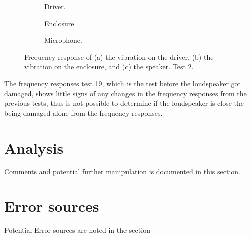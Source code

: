 \begin{figure}[H]
\centering
\begin{subfigure}[t]{0.37\textwidth}
	
	\caption{Driver.}
	\label{fig:FFT_driver10}
\end{subfigure}
\begin{subfigure}[t]{0.28\textwidth}
	
	\caption{Enclosure.}
	\label{fig:FFT_enclosure19}
\end{subfigure}
\begin{subfigure}[t]{0.32\textwidth}
	
	\caption{Microphone.}
	\label{fig:FFT_mic19}
\end{subfigure}
\caption{Frequency response of (a) the vibration on the driver, (b) the vibration on the enclosure, and (c) the speaker. Test 2.}
\label{fig:FFT1}
\end{figure} 

The frequency responses test 19, which is the test before the loudspeaker got damaged, shows little signs of any changes in the frequency responses from the previous tests, thus is not possible to determine if the loudspeaker is close the being damaged alone from the frequency responses.










\section{Analysis}

Comments and potential further manipulation is documented in this section. 

\section{Error sources}

Potential Error sources are noted in the section

